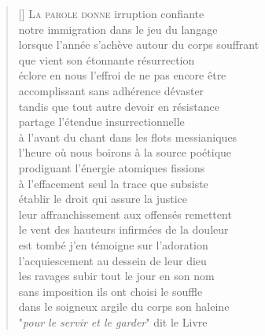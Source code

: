 \documentclass[a4paper, titlepage, twoside, 12pt]{book}
\begin{document}
\newpage
\vspace*{2cm}
\settowidth{\versewidth}{éclore en nous l'effroi de ne pas encore être}
\begin{verse}[\versewidth]
{\lettrine[lines=1]{\textcolor[gray]{0.6}{L}}{\space a parole donne}}  irruption confiante\\
notre immigration dans le jeu du langage\\
lorsque l'année s'achève autour du corps souffrant\\
que vient son étonnante résurrection\\
éclore en nous l'effroi de ne pas encore être\\
accomplissant sans adhérence dévaster\\
tandis que tout autre devoir en résistance\\
partage l'étendue insurrectionnelle\\
à l'avant du chant dans les flots messianiques\\
l'heure où nous boirons à la source poétique\\
prodiguant l'énergie atomiques fissions\\
à l'effacement seul la trace que subsiste\\
établir le droit qui assure la justice\\
leur affranchissement aux offensés remettent\\
le vent des hauteurs infirmées de la douleur\\
est tombé j'en témoigne sur l'adoration\\
l'acquiescement au dessein de leur dieu\\
les ravages subir tout le jour en son nom\\
sans imposition ils ont choisi le souffle\\
dans le soigneux argile du corps son haleine\\
"\emph{pour le servir et le garder}" dit le Livre 
\end{verse}
\end{document}
